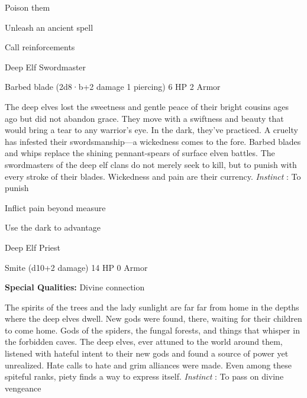 \startitemize[1,packed]
         
\item Poison them

         
\item Unleash an ancient spell

         
\item Call reinforcements

       
\stopitemize
       
\startMonsterName
Deep Elf Swordmaster	 
\stopMonsterName
       

Barbed blade (2d8·b+2 damage 1 piercing)	6 HP	2 Armor

       


       
\startMonsterDescription
The deep elves lost the sweetness and gentle peace of their bright cousins ages ago but did not abandon grace. They move with a swiftness and beauty that would bring a tear to any warrior’s eye. In the dark, they’ve practiced. A cruelty has infested their swordsmanship—a wickedness comes to the fore. Barbed blades and whips replace the shining pennant-spears of surface elven battles. The swordmasters of the deep elf clans do not merely seek to kill, but to punish with every stroke of their blades. Wickedness and pain are their currency. {\em Instinct} : To punish
\stopMonsterDescription
       
\startitemize[1,packed]
         
\item Inflict pain beyond measure

         
\item Use the dark to advantage

       
\stopitemize
       
\startMonsterName
Deep Elf Priest	 
\stopMonsterName
       

Smite (d10+2 damage)	14 HP	0 Armor

       


       
\startMonsterQualities
         {\bf Special Qualities:}  Divine connection
\stopMonsterQualities
       
\startMonsterDescription
The spirits of the trees and the lady sunlight are far far from home in the depths where the deep elves dwell. New gods were found, there, waiting for their children to come home. Gods of the spiders, the fungal forests, and things that whisper in the forbidden caves. The deep elves, ever attuned to the world around them, listened with hateful intent to their new gods and found a source of power yet unrealized. Hate calls to hate and grim alliances were made. Even among these spiteful ranks, piety finds a way to express itself. {\em Instinct} : To pass on divine vengeance
\stopMonsterDescription
       
